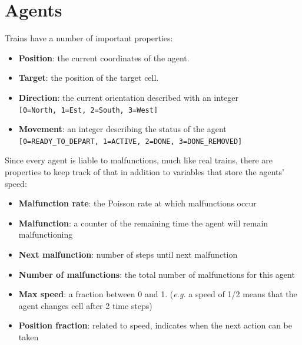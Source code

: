 \section{Agents}
Trains have a number of important properties:
\begin{itemize}
\item \textbf{Position}: the current coordinates of the agent.
\item \textbf{Target}: the position of the target cell.
\item \textbf{Direction}: the current orientation described with an integer\\
    \verb|[0=North, 1=Est, 2=South, 3=West]| 
\item \textbf{Movement}: an integer describing the status of the agent\\
    \verb|[0=READY_TO_DEPART, 1=ACTIVE, 2=DONE, 3=DONE_REMOVED]|
\end{itemize}
\noindent
Since every agent is liable to malfunctions, much like real trains, there are properties to keep track of that in addition to variables that store the agents' speed:
\begin{itemize}
\item 	\textbf{Malfunction rate}: the Poisson rate at which malfunctions occur
\item \textbf{Malfunction}: a counter of the remaining time the agent will remain malfunctioning
\item \textbf{Next malfunction}: number of steps until next malfunction
\item \textbf{Number of malfunctions}: the total number of malfunctions for this agent
\item \textbf{Max speed}: a fraction between 0 and 1. (\textit{e.g.} a speed of 1/2 means that the agent changes cell after 2 time steps)
\item \textbf{Position fraction}: related to speed, indicates when the next action can be taken
\end{itemize}
